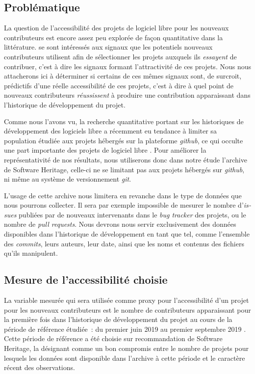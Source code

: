 \documentclass[dvipsnames,runningheads]{llncs}
\newcommand{\en}[1]{\foreignlanguage{english}{\emph{#1}}}
\begin{document}
    \subsection{Problématique}

    La question de l'accessibilité des projets de logiciel libre pour les nouveaux contributeurs est encore
    assez peu explorée de façon quantitative dans la littérature. \textcite{signals-2019} se sont intéressés
    aux signaux que les potentiels nouveaux contributeurs utilisent afin de sélectionner les projets auxquels
    ils \emph{essayent} de contribuer, c'est à dire les signaux formant l'attractivité de ces projets. Nous
    nous attacherons ici à déterminer si certains de ces mêmes signaux sont, de surcroit, prédictifs d'une
    réelle accessibilité de ces projets, c'est à dire à quel point de nouveaux contributeurs
    \emph{réussissent} à produire une contribution apparaissant dans l'historique de développement du projet.

    Comme nous l'avons vu, la recherche quantitative portant sur les historiques de développement des
    logiciels libre a récemment eu tendance à limiter sa population étudiée aux projets hébergés sur la
    plateforme \en{github}, ce qui occulte une part importante des projets de logiciel libre
    \parencites{mining-github-2014}{penumbra-oss-2022}. Pour améliorer la représentativité de nos résultats,
    nous utiliserons donc dans notre étude l'archive de Software Heritage, celle-ci ne se limitant pas aux
    projets hébergés sur \en{github}, ni même au système de versionnement \en{git}.

    L'usage de cette archive nous limitera en revanche dans le type de données que nous pourrons collecter. Il
    sera par exemple impossible de mesurer le nombre d'\en{issues} publiées par de nouveaux intervenants dans
    le \en{bug tracker} des projets, ou le nombre de \en{pull requests}. Nous devrons nous servir
    exclusivement des données disponibles dans l'historique de développement en tant que tel, comme l'ensemble
    des \en{commits}, leurs auteurs, leur date, ainsi que les noms et contenus des fichiers qu'ils manipulent.

    \subsection{Mesure de l'accessibilité choisie}

    La variable mesurée qui sera utilisée comme proxy pour l'accessibilité d'un projet pour les nouveaux
    contributeurs est le nombre de contributeurs apparaissant pour la première fois dans l'historique de
    développement du projet au cours de la période de référence étudiée : du premier juin 2019 au premier
    septembre 2019 \parencite[voir section \ref{sec:accessibility-measure}, ainsi
    que][p.~13,16]{signals-2019}. Cette période de référence a été choisie sur recommandation de Software
    Heritage, la désignant comme un bon compromis entre le nombre de projets pour lesquels les données sont
    disponible dans l'archive à cette période et le caractère récent des observations.
\end{document}
